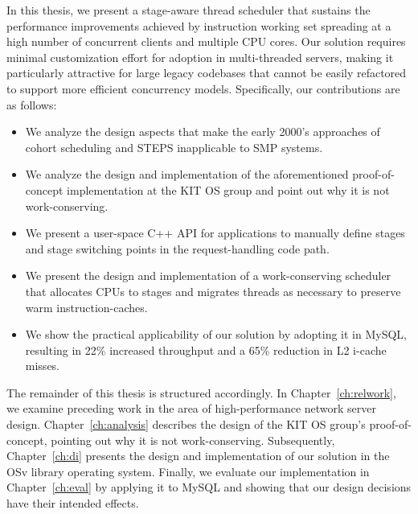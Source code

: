 \documentclass[12pt,a4paper]{book}
\begin{document}
In this thesis, we present a stage-aware thread scheduler that sustains the performance improvements achieved by instruction working set spreading at a high number of concurrent clients and multiple CPU cores.
Our solution requires minimal customization effort for adoption in multi-threaded servers, making it particularly attractive for large legacy codebases that cannot be easily refactored to support more efficient concurrency models.
Specifically, our contributions are as follows:
\begin{itemize}
    \item We analyze the design aspects that make the early 2000's approaches of cohort scheduling and STEPS inapplicable to SMP systems.
    \item We analyze the design and implementation of the aforementioned proof-of-concept implementation at the KIT OS group and point out why it is not work-conserving.
    \item We present a user-space C++ API for applications to manually define stages and stage switching points in the request-handling code path.
    \item We present the design and implementation of a work-conserving scheduler that allocates CPUs to stages and migrates threads as necessary to preserve warm instruction-caches.
    \item We show the practical applicability of our solution by adopting it in MySQL, resulting in 22\% increased throughput and a 65\% reduction in L2 i-cache misses.
\end{itemize}

The remainder of this thesis is structured accordingly.
In Chapter~\ref{ch:relwork}, we examine preceding work in the area of high-performance network server design.
Chapter~\ref{ch:analysis} describes the design of the KIT OS group's proof-of-concept, pointing out why it is not work-conserving.
Subsequently, Chapter~\ref{ch:di} presents the design and implementation of our solution in the OSv library operating system.
Finally, we evaluate our implementation in Chapter~\ref{ch:eval} by applying it to MySQL and showing that our design decisions have their intended effects.
\end{document}
